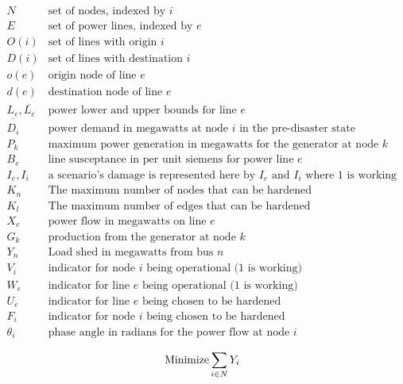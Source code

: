 \begin{displaymath}
\begin{array}{ll}
N & \mbox{set of nodes, indexed by $i$} \\
E & \mbox{set of power lines, indexed by $e$}\\
O(i) & \mbox{set of lines with origin $i$} \\
D(i) & \mbox{set of lines with destination $i$} \\
o(e) & \mbox{origin node of line $e$} \\
d(e) & \mbox{destination node of line $e$} \\
\underline{L_e},\overline{L_e} & \mbox{power lower and upper bounds for line $e$}\\
D_i & \mbox{power demand in megawatts at node $i$ in the pre-disaster state}\\
P_k & \mbox{maximum power generation in megawatts for the generator at node $k$}\\
B_e &  \mbox{line susceptance in per unit siemens for power line $e$}\\
I_e, I_i & \mbox{a scenario's damage is represented here by $I_e$ and $I_i$ where 1 is working }\\
K_n & \mbox{The maximum number of nodes that can be hardened}\\
K_l & \mbox{The maximum number of edges that can be hardened}\\
X_{e} & \mbox{power flow in megawatts on line $e$}\\
G_{k} & \mbox{production from the generator at node $k$}\\
Y_{n} & \mbox{Load shed in megawatts from bus $n$}\\ 
V_i & \mbox{indicator for node $i$ being operational (1 is working) }\\
W_{e} & \mbox{indicator for line $e$ being operational (1 is working) }\\
U_{e} & \mbox{indicator for line $e$ being chosen to be hardened}\\
F_i & \mbox{indicator for node $i$ being chosen to be hardened}\\
\theta_i & \mbox{phase angle in radians for the power flow at node $i$}\\

\end{array}
\end{displaymath}
\begin{equation}
\textnormal{Minimize} \sum_{i \in N}  Y_i
\end{equation}

